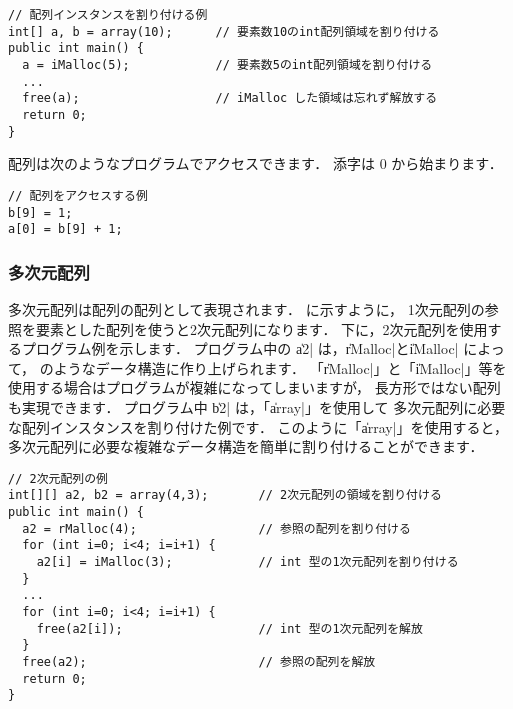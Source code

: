 \begin{mylist}
\begin{verbatim}
// 配列インスタンスを割り付ける例
int[] a, b = array(10);      // 要素数10のint配列領域を割り付ける
public int main() {
  a = iMalloc(5);            // 要素数5のint配列領域を割り付ける
  ...
  free(a);                   // iMalloc した領域は忘れず解放する
  return 0;
}
\end{verbatim}
\end{mylist}

配列は次のようなプログラムでアクセスできます．
添字は 0 から始まります．

\begin{mylist}
\begin{verbatim}
// 配列をアクセスする例
b[9] = 1;
a[0] = b[9] + 1;
\end{verbatim}
\end{mylist}

\subsubsection{多次元配列}

多次元配列は配列の配列として表現されます．
に示すように，
1次元配列の参照を要素とした配列を使うと2次元配列になります．
下に，2次元配列を使用するプログラム例を示します．
プログラム中の \|a2| は，\|rMalloc|と\|iMalloc| によって，
のようなデータ構造に作り上げられます．
「\|rMalloc|」と「\|iMalloc|」等を使用する場合はプログラムが複雑になってしまいますが，
長方形ではない配列も実現できます．
プログラム中 \|b2| は，「\|array|」を使用して
多次元配列に必要な配列インスタンスを割り付けた例です．
このように「\|array|」を使用すると，
多次元配列に必要な複雑なデータ構造を簡単に割り付けることができます．



\begin{mylist}
\begin{verbatim}
// 2次元配列の例
int[][] a2, b2 = array(4,3);       // 2次元配列の領域を割り付ける
public int main() {
  a2 = rMalloc(4);                 // 参照の配列を割り付ける
  for (int i=0; i<4; i=i+1) {
    a2[i] = iMalloc(3);            // int 型の1次元配列を割り付ける
  }
  ...
  for (int i=0; i<4; i=i+1) {
    free(a2[i]);                   // int 型の1次元配列を解放
  }
  free(a2);                        // 参照の配列を解放
  return 0;
}
\end{verbatim}
\end{mylist}

